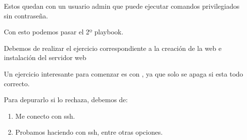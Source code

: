 Estos quedan con un usuario admin que puede ejecutar comandos privilegiados sin contraseña.

Con esto podemos pasar el 2º playbook.

Debemos de realizar el ejercicio correspondiente a la creación de la web e instalación del servidor web

Un ejercicio interesante para comenzar es con , ya que solo se apaga si esta todo correcto.

Para depurarlo si lo rechaza, debemos de:
\begin{enumerate}
    \item Me conecto con ssh.
    \item Probamos haciendo  con ssh, entre otras opciones.
\end{enumerate}

